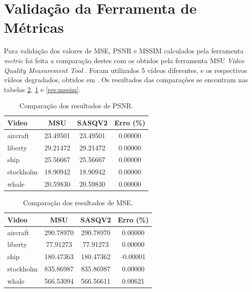 \section{Validação da Ferramenta de Métricas}

Para validação dos valores de MSE, PSNR e MSSIM calculados pela ferramenta \emph{metric} foi feita a comparação destes com os obtidos pela ferramenta MSU \emph{Video Quality Measurement Tool} \cite{msutool}.
Foram utilizados 5 vídeos diferentes, e os respectivos vídeos degradados,  obtidos em \cite{videolab}. Os resultados das comparações se encontram nas tabelas \ref{res:mse}, \ref{res:psnr} e \ref{res:mssim}.

\begin{table}[!htb]
	\centering
	\caption{Comparação dos resultados de PSNR.}
	\label{res:psnr}
	\begin{tabular}{lccc}
		\hline
		Video	 & MSU	 & SASQV2	 & Erro (\%) \\ \hline
		aircraft	 & 23.49501 & 23.49501 & 0.00000	 \\ 
		liberty	 & 29.21472 & 29.21472 & 0.00000	 \\ 
		ship	 & 25.56667 & 25.56667 & 0.00000	 \\ 
		stockholm & 18.90942 & 18.90942 & 0.00000	 \\ 
		whale	 & 20.59830 & 20.59830 & 0.00000	 \\
	\hline
	\end{tabular}
\end{table}

\begin{table}[!htb]
	\centering
	\caption{Comparação dos resultados de MSE.}
	\label{res:mse}
	\begin{tabular}{lccc}
	\hline
	Video	 & MSU	 & SASQV2	 & Erro (\%) \\ \hline
	aircraft	 & 290.78970 & 290.78970 & 0.00000	 \\ 
	liberty	 & 77.91273	 & 77.91273	 & 0.00000	 \\ 
	ship	 & 180.47363 & 180.47362 & -0.00001 \\ 
	stockholm & 835.86987 & 835.86987 & 0.00000	 \\ 
	whale	 & 566.53094 & 566.56611 & 0.00621	 \\
	\hline
	\end{tabular}
\end{table}

